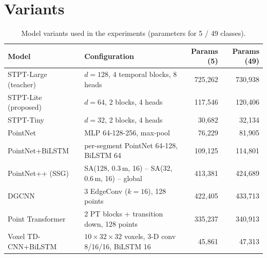 \section{Variants}
\begin{table}[h]
\centering
\caption{Model variants used in the experiments (parameters for 5 / 49 classes).}
\label{tab:variants}
\small
\begin{tabular}{L{3.4cm}L{6.4cm}r r}
\toprule
Model & Configuration & Params (5) & Params (49) \\
\midrule
STPT-Large (teacher) & $d=128$, 4 temporal blocks, 8 heads & 725{,}262 & 730{,}938 \\
STPT-Lite (proposed) & $d=64$, 2 blocks, 4 heads & 117{,}546 & 120{,}406 \\
STPT-Tiny & $d=32$, 2 blocks, 4 heads & 30{,}682 & 32{,}134 \\
PointNet & MLP 64-128-256, max-pool & 76{,}229 & 81{,}905 \\
PointNet+BiLSTM & per-segment PointNet 64-128, BiLSTM 64 & 109{,}125 & 114{,}801 \\
PointNet++ (SSG) & SA(128, 0.3\,m, 16) -- SA(32, 0.6\,m, 16) -- global & 413{,}381 & 424{,}689 \\
DGCNN & 3 EdgeConv ($k=16$), 128 points & 422{,}405 & 433{,}713 \\
Point Transformer & 2 PT blocks + transition down, 128 points & 335{,}237 & 340{,}913 \\
Voxel TD-CNN+BiLSTM & $10\times32\times32$ voxels, 3-D conv 8/16/16, BiLSTM 16 & 45{,}861 & 47{,}313 \\
\bottomrule
\end{tabular}
\end{table}
